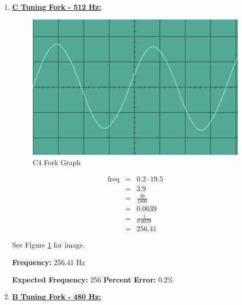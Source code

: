 \documentclass[12pt,oneside]{article}
\begin{document}
\begin{enumerate}
\item \underline{\bf C Tuning Fork - 512 Hz:}

\color{red}

\begin{figure}[H]

{\centering \includegraphics[width=15cm,]{./images/c4} 

}

\caption{C4 Fork Graph}\label{fig:c4}
\end{figure}

\begin{eqnarray}
\text{freq} & = & 0.2 \cdot 19.5 \\
            & = & 3.9 \\
            & = & \frac{39}{1000} \\
            & = & 0.0039 \\
            & = & \frac{1}{0.0039} \\
            & = & 256.41
\end{eqnarray}

See Figure \ref{fig:c4} for image.

\textbf{Frequency:} 256.41 Hz

\par

\textbf{Expected Frequency:} 256 \textbf{Percent Error: } 0.2\%

\color{black}

\item \underline{\bf B Tuning Fork - 480 Hz:}
\color{red}

\begin{figure}[H]


\end{figure}
\end{enumerate}
\end{document}
